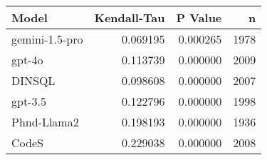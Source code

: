 \begin{tabular}{lrrr}
\toprule
Model & Kendall-Tau & P Value & n \\
\midrule
gemini-1.5-pro & 0.069195 & 0.000265 & 1978 \\
gpt-4o & 0.113739 & 0.000000 & 2009 \\
DINSQL & 0.098608 & 0.000000 & 2007 \\
gpt-3.5 & 0.122796 & 0.000000 & 1998 \\
Phnd-Llama2 & 0.198193 & 0.000000 & 1936 \\
CodeS & 0.229038 & 0.000000 & 2008 \\
\bottomrule
\end{tabular}
